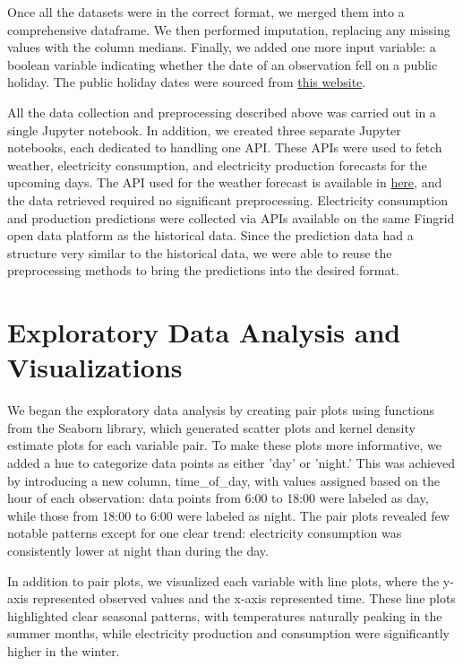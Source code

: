 \documentclass{article}
\numberwithin{equation}{section}
\begin{document}
Once all the datasets were in the correct format, we merged them into a comprehensive dataframe. We then performed imputation, replacing any missing values with the column medians. Finally, we added one more input variable: a boolean variable indicating whether the date of an observation fell on a public holiday. The public holiday dates were sourced from \href{https://www.officeholidays.com/countries/finland/2021}{this website}.

All the data collection and preprocessing described above was carried out in a single Jupyter notebook. In addition, we created three separate Jupyter notebooks, each dedicated to handling one API. These APIs were used to fetch weather, electricity consumption, and electricity production forecasts for the upcoming days. The API used for the weather forecast is available in \href{https://api.open-meteo.com/v1/forecast}{here}, and the data retrieved required no significant preprocessing. Electricity consumption and production predictions were collected via APIs available on the same Fingrid open data platform as the historical data. Since the prediction data had a structure very similar to the historical data, we were able to reuse the preprocessing methods to bring the predictions into the desired format.

\section{Exploratory Data Analysis and Visualizations}

We began the exploratory data analysis by creating pair plots using functions from the Seaborn library, which generated scatter plots and kernel density estimate plots for each variable pair. To make these plots more informative, we added a hue to categorize data points as either 'day' or 'night.' This was achieved by introducing a new column, time_of_day, with values assigned based on the hour of each observation: data points from 6:00 to 18:00 were labeled as day, while those from 18:00 to 6:00 were labeled as night. The pair plots revealed few notable patterns except for one clear trend: electricity consumption was consistently lower at night than during the day.

In addition to pair plots, we visualized each variable with line plots, where the y-axis represented observed values and the x-axis represented time. These line plots highlighted clear seasonal patterns, with temperatures naturally peaking in the summer months, while electricity production and consumption were significantly higher in the winter.
\end{document}

